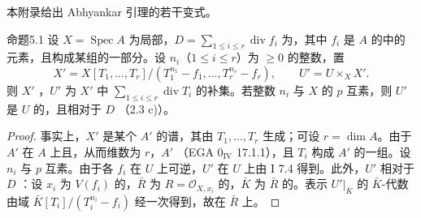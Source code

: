 本附录给出 Abhyankar 引理的若干变式。

\begin{SGAresult}{命题}{5.1}
设 $X=\operatorname{Spec}A$ 为局部，$D=\sum_{1\leq i\leq r}\operatorname{div}f_i$ 为，其中 $f_i$ 是 $A$ 的中的元素，且构成某组的一部分。设 $n_i$（$1\leq i\leq r$）为 $\geq0$ 的整数，置
\[X'=X[T_1,\ldots,T_r]/(T_1^{n_1}-f_1,\ldots,T_r^{n_r}-f_r),\qquad U'=U\times_X X'.\]
则 $X'$ ，$U'$ 为 $X'$ 中 $\sum_{1\leq i\leq r}\operatorname{div}T_i$ 的补集。若整数 $n_i$ 与 $X$ 的 $p$ 互素，则 $U'$ 是 $U$ 的，且相对于 $D$ （2.3 c)）。
\end{SGAresult}
\begin{proof}
事实上，$X'$ 是某个 $A'$ 的谱，其由 $T_1,\ldots,T_r$ 生成；可设 $r=\dim A$。由于 $A'$ 在 $A$ 上且，从而维数为 $r$，$A'$ （EGA $0_{\mathrm{IV}}$ 17.1.1），且 $T_i$ 构成 $A'$ 的一组。设 $n_i$ 与 $p$ 互素。由于各 $f_i$ 在 $U$ 上可逆，$U'$ 在 $U$ 上由 I 7.4 得到。此外，$U'$ 相对于 $D$ ：设 $x_i$ 为 $V(f_i)$ 的，$\bar R$ 为 $R=\mathcal O_{X,x_i}$ 的，$\bar K$ 为 $\bar R$ 的。表示 $U'|_{\bar K}$ 的 $\bar K$-代数由域 $\bar K[T_i]/(T_i^{n_i}-f_i)$ 经一次得到，故在 $\bar R$ 上。
\end{proof}

